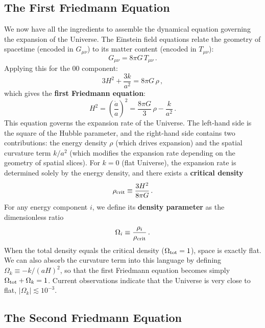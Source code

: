 \subsection{The First Friedmann Equation}

We now have all the ingredients to assemble the dynamical equation governing the expansion of the Universe. The Einstein field equations relate the geometry of spacetime (encoded in $G_{\mu\nu}$) to its matter content (encoded in $T_{\mu\nu}$):
\begin{equation}
    G_{\mu\nu} = 8\pi G\,T_{\mu\nu}\,.
\end{equation}
Applying this for the $00$ component:
\begin{equation}
    3H^2 + \frac{3k}{a^2} = 8\pi G\,\rho\,,
\end{equation}
which gives the \textbf{first Friedmann equation}:
\begin{equation}
\boxed{H^2 = \left(\frac{\dot{a}}{a}\right)^{\!2} = \frac{8\pi G}{3}\,\rho - \frac{k}{a^2}\,.}
\end{equation}
This equation governs the expansion rate of the Universe. The left-hand side is the square of the Hubble parameter, and the right-hand side contains two contributions: the energy density $\rho$ (which drives expansion) and the spatial curvature term $k/a^2$ (which modifies the expansion rate depending on the geometry of spatial slices). For $k=0$ (flat Universe), the expansion rate is determined solely by the energy density, and there exists a \textbf{critical density}
\begin{equation}
    \rho_{\rm crit} \equiv \frac{3H^2}{8\pi G}\,.
\end{equation}
For any energy component $i$, we define its \textbf{density parameter} as the dimensionless ratio
\begin{equation}\label{eq:density_parameter}
    \Omega_i \equiv \frac{\rho_i}{\rho_{\rm crit}}\,.
\end{equation}
When the total density equals the critical density ($\Omega_{\rm tot}=1$), space is exactly flat. We can also absorb the curvature term into this language by defining $\Omega_k\equiv -k/(aH)^2$, so that the first Friedmann equation becomes simply $\Omega_{\rm tot}+\Omega_k=1$. Current observations indicate that the Universe is very close to flat, $|\Omega_k|\lesssim 10^{-3}$.

\subsection{The Second Friedmann Equation}

